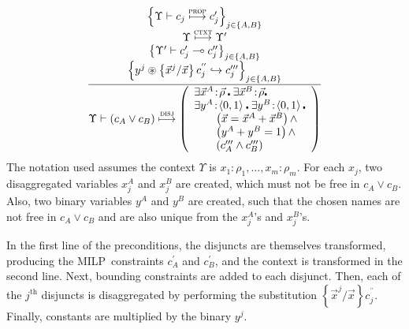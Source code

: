 \documentclass[preprint]{sigplanconf}%
\theoremstyle{remark}
\begin{document}
\begin{equation}
\frac{%
\begin{array}
[c]{c}%
\left\{  \Upsilon\vdash c_{j}\overset{\text{\textsc{prop}}}{\longmapsto}%
c_{j}^{\prime}\right\}  _{j\in\left\{  A,B\right\}  }\\
\Upsilon\overset{\text{\textsc{ctxt}}}{\longmapsto}\Upsilon^{\prime}\\
\left\{  \Upsilon^{\prime}\vdash c_{j}^{\prime}\multimap c_{j}^{\prime\prime
}\right\}  _{j\in\left\{  A,B\right\}  }\\
\left\{  y^{j}\circledast\left\{  \vec{x}^{j}/\vec{x}\right\}  c_{j}%
^{^{\prime\prime}}\hookrightarrow c_{j}^{\prime\prime\prime}\right\}
_{j\in\left\{  A,B\right\}  }%
\end{array}
}{\Upsilon\vdash\left(  c_{A}\vee c_{B}\right)  \overset{\text{\textsc{disj}}%
}{\longmapsto}\left(
\begin{array}
[c]{l}%
\exists\vec{x}^{A}\!:\!\vec{\rho}\centerdot\exists\vec{x}^{B}\!:\!\vec{\rho
}\centerdot\\
\exists y^{A}\!:\!\left\langle 0,1\right\rangle \centerdot\exists
y^{B}\!:\!\left\langle 0,1\right\rangle \centerdot\\
\qquad\left(  \vec{x}=\vec{x}^{A}+\vec{x}^{B}\right)  \wedge\\
\qquad\left(  y^{A}+y^{B}=1\right)  \wedge\\
\qquad\left(  c_{A}^{\prime\prime\prime}\wedge c_{B}^{\prime\prime\prime
}\right)
\end{array}
\right)  } \label{disj_compiler}%
\end{equation}
The notation used assumes the context $\Upsilon$ is $x_{1}\!:\!\rho_{1}%
,\ldots,x_{m}\!:\!\rho_{m}$. For each $x_{j}$, two disaggregated variables
$x_{j}^{A}$ and $x_{j}^{B}$ are created, which must not be free in $c_{A}\vee
c_{B}$. Also, two binary variables $y^{A}$ and $y^{B}$ are created, such that
the chosen names are not free in $c_{A}\vee c_{B}$ and are also unique from
the $x_{j}^{A}$'s and $x_{j}^{B}$'s.

In the first line of the preconditions, the disjuncts are themselves
transformed, producing the MILP\ constraints $c_{A}^{\prime}$ and
$c_{B}^{\prime}$, and the context is transformed in the second line. Next,
bounding constraints are added to each disjunct. Then, each of the
$j^{\text{th}}$ disjuncts is disaggregated by performing the substitution
$\left\{  \vec{x}^{j}/\vec{x}\right\}  c_{j}^{^{\prime\prime}}$. Finally,
constants are multiplied by the binary $y^{j}$.
\end{document}
